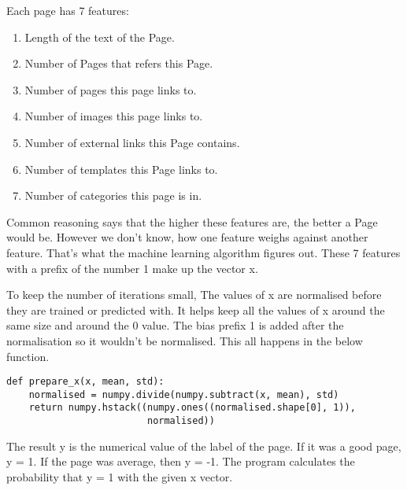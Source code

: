 
Each page has 7 features:
\begin{enumerate}
  \item Length of the text of the Page.
  \item Number of Pages that refers this Page.
  \item Number of pages this page links to.
  \item Number of images this page links to.
  \item Number of external links this Page contains.  
  \item Number of templates this Page links to.
  \item Number of categories this page is in.
\end{enumerate}
Common reasoning says that the higher these features are, the better a Page
would be. However we don't know, how one feature weighs against another
feature. That's what the machine learning algorithm figures out. These 7
features with a prefix of the number 1 make up the vector x.

To keep the number of iterations small, The values of x are normalised before
they are trained or predicted with. It helps keep all the values of x around the
same size and around the 0 value. The bias prefix 1 is added after the
normalisation so it wouldn't be normalised. This all happens in the
below function.
\begin{verbatim}
def prepare_x(x, mean, std):
    normalised = numpy.divide(numpy.subtract(x, mean), std)
    return numpy.hstack((numpy.ones((normalised.shape[0], 1)),
                         normalised))
\end{verbatim}

The result y is the numerical value of the label of the page. If it was a good
page, y = 1. If the page was average, then y = -1. The program calculates
the probability that y = 1 with the given x vector.

